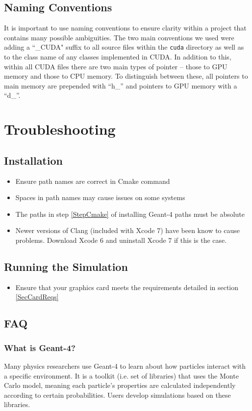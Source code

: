 \documentclass[12pt]{article}
\begin{document}
\subsection{Naming Conventions} %
It is important to use naming conventions to ensure clarity within a project that contains many possible ambiguities. The two main conventions we used were adding a ``\_CUDA" suffix to all source files within the \texttt{cuda} directory as well as to the class name of any classes implemented in CUDA. In addition to this, within all CUDA files there are two main types of pointer -- those to GPU memory and those to CPU memory. To distinguish between these, all pointers to main memory are prepended with ``h\_'' and pointers to GPU memory with a ``d\_''.

\section{Troubleshooting} %
\subsection{Installation} %
\begin{itemize}
\item Ensure path names are correct in Cmake command
\item Spaces in path names may cause issues on some systems
\item The paths in step \ref{StepCmake} of installing Geant-4 paths must be absolute
\item Newer versions of Clang (included with Xcode 7) have been know to cause problems. Download Xcode 6 and uninstall Xcode 7 if this is the case.
\end{itemize}

\subsection{Running the Simulation} %
\begin{itemize}
\item Ensure that your graphics card meets the requirements detailed in section \ref{SecCardReqs}
\end{itemize}

\subsection{FAQ} %
\subsubsection{What is Geant-4?}
Many physics researchers use Geant-4 to learn about how particles interact with a specific environment. It is a toolkit (i.e. set of libraries) that uses the Monte Carlo model, meaning each particle's properties are calculated independently according to certain probabilities. Users develop simulations based on these libraries.
\end{document}
